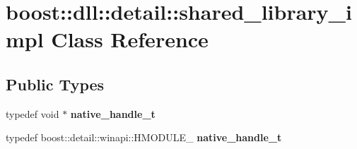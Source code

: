 \hypertarget{a01624}{}\section{boost\+:\+:dll\+:\+:detail\+:\+:shared\+\_\+library\+\_\+impl Class Reference}
\label{a01624}
\subsection*{Public Types}
\begin{DoxyCompactItemize}
\item 
\mbox{\label{a01624_a0fb8d4c1967616c6f9c82ce3d70e11c6}} 
typedef void $\ast$ {\bfseries native\+\_\+handle\+\_\+t}
\item 
\mbox{\label{a01624_a2a11230bd7993f39e4fd73ed78a89463}} 
typedef boost\+::detail\+::winapi\+::\+H\+M\+O\+D\+U\+L\+E\+\_\+ {\bfseries native\+\_\+handle\+\_\+t}
\end{DoxyCompactItemize}
